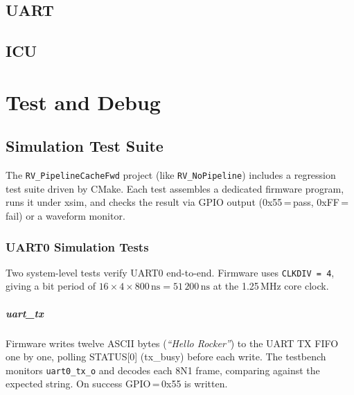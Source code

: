 %

\section{UART}


\section{ICU}




%

\chapter{Test and Debug}

\section{Simulation Test Suite}
\label{sec:simtest01}

The \texttt{RV\_PipelineCacheFwd} project (like \texttt{RV\_NoPipeline}) includes a
regression test suite driven by CMake.
Each test assembles a dedicated firmware program, runs it under xsim, and checks
the result via GPIO output (0x55\,=\,pass, 0xFF\,=\,fail) or a waveform monitor.

\subsection{UART0 Simulation Tests}
\label{subsec:uartsimtest}

Two system-level tests verify UART0 end-to-end.
Firmware uses \texttt{CLKDIV\,=\,4}, giving a bit period of
$16 \times 4 \times 800\,\text{ns} = 51\,200\,\text{ns}$ at the 1.25\,MHz core clock.

\paragraph{uart\_tx}
Firmware writes twelve ASCII bytes (\textit{``Hello Rocker''}) to the UART TX FIFO
one by one, polling STATUS[0] (tx\_busy) before each write.
The testbench monitors \texttt{uart0\_tx\_o} and decodes each 8N1 frame,
comparing against the expected string.
On success GPIO\,=\,0x55 is written.

